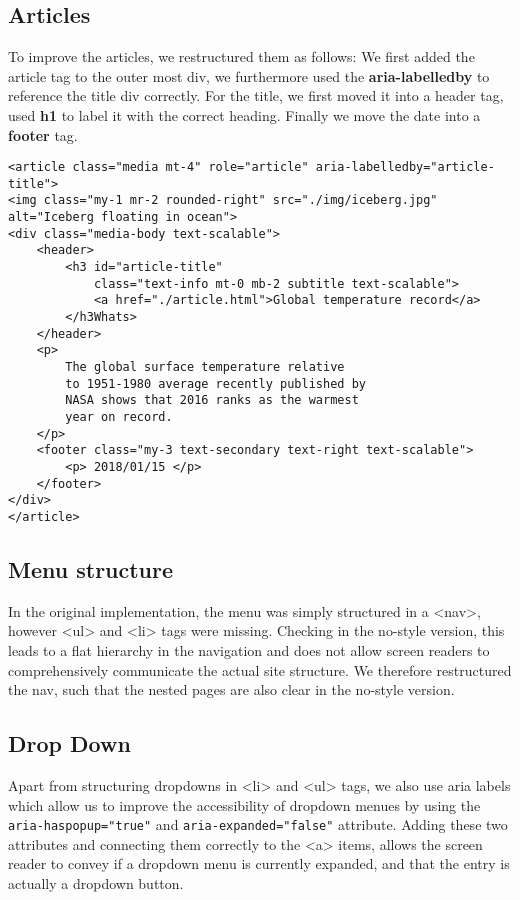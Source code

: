 \documentclass[a4paper,11pt]{article}
\theoremstyle{mytheor}
\begin{document}
\subsection{Articles}
To improve the articles, we restructured them as follows: 
We first added the article tag to the outer most div, we furthermore used the \textbf{aria-labelledby} to reference the title div correctly. For the title, we first moved it into a header tag, used \textbf{h1} to label it with the correct heading. 
Finally we move the date into a \textbf{footer} tag.
\begin{verbatim}
<article class="media mt-4" role="article" aria-labelledby="article-title"> 
<img class="my-1 mr-2 rounded-right" src="./img/iceberg.jpg" 
alt="Iceberg floating in ocean">
<div class="media-body text-scalable">
    <header>
        <h3 id="article-title" 
            class="text-info mt-0 mb-2 subtitle text-scalable">
            <a href="./article.html">Global temperature record</a>
        </h3Whats>
    </header>
    <p>
        The global surface temperature relative 
        to 1951-1980 average recently published by
        NASA shows that 2016 ranks as the warmest
        year on record.
    </p>
    <footer class="my-3 text-secondary text-right text-scalable">
        <p> 2018/01/15 </p>
    </footer>
</div>
</article>

\end{verbatim}
\subsection{Menu structure}
In the original implementation, the menu was simply structured in a <nav>, however <ul> and <li> tags were missing. Checking in the no-style version, this leads to a flat hierarchy in the navigation and does not allow screen readers to comprehensively communicate the actual site structure. We therefore restructured the nav, such that the nested pages are also clear in the no-style version. 

\subsection{Drop Down}
Apart from structuring dropdowns in <li> and <ul> tags, we also use aria labels which allow us to improve the accessibility of dropdown menues by using the \texttt{aria-haspopup="true"} and \texttt{aria-expanded="false"} attribute. Adding these two attributes and connecting them correctly to the <a> items, allows the screen reader to convey if a dropdown menu is currently expanded, and that the entry is actually a dropdown button.\\
\end{document}
